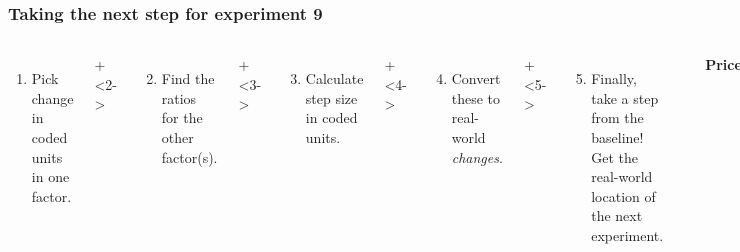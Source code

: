 \documentclass[handout,11pt,aspectratio=169,mathserif]{beamer}
\begin{document}
\begin{frame}\frametitle{Taking the next step for experiment 9}
	\begin{columns}[T]
		
			\vspace{0.1cm}
			{\tiny 
				\begin{enumerate}
					\item	Pick change in coded units in one factor.
				\end{enumerate}
			 \par}
			\onslide+<2->{
				{\tiny 
					\begin{enumerate}\setcounter{enumi}{1}
						\item	Find the ratios for the other factor(s).
					\end{enumerate}
				
				\par}
			}
			
			\vspace{0.9cm}
			\onslide+<3->{
				{\tiny 
					\begin{enumerate}\setcounter{enumi}{2}
						\item	Calculate step size in coded units.
					\end{enumerate}
				
				\par}
			}
			
			\vspace{0.4cm}
			\onslide+<4->{
				{\tiny 
					\begin{enumerate}\setcounter{enumi}{3}
						\item	Convert these to real-world \emph{changes}.
					\end{enumerate}
				
				\par}
			}
			
			\vspace{1cm}
			\onslide+<5->{
				{\tiny 
					\begin{enumerate}\setcounter{enumi}{4}
						\item	Finally, take a step from the baseline! Get the real-world location
						of the next experiment.
					\end{enumerate}
				
				\par}
			}
				
			\rule[3mm]{0.01cm}{85mm}%
			
			
			\centerline{\textbf{Price}}
			

\end{columns}
\end{frame}
\end{document}
